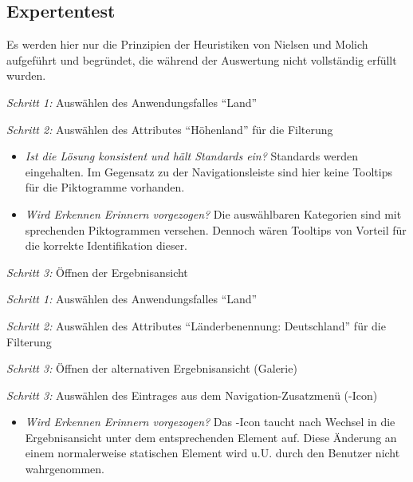 \subsection{Expertentest}
Es werden hier nur die Prinzipien der Heuristiken von Nielsen und Molich aufgeführt und begründet, die während der Auswertung nicht vollständig erfüllt wurden.\par
{}
\textit{Schritt 1:} Auswählen des Anwendungsfalles \enquote{Land}\par
\textit{Schritt 2:} Auswählen des Attributes \enquote{Höhenland} für die Filterung\par
\begin{itemize}
 \item \textit{Ist die Lösung konsistent und hält Standards ein?} Standards werden eingehalten. Im Gegensatz zu der Navigationsleiste sind hier keine Tooltips für die Piktogramme vorhanden.
 \item \textit{Wird Erkennen Erinnern vorgezogen?} Die auswählbaren Kategorien sind mit sprechenden Piktogrammen versehen. Dennoch wären Tooltips von Vorteil für die korrekte Identifikation dieser.
\end{itemize}
\textit{Schritt 3:} Öffnen der Ergebnisansicht\par
{}\par
\textit{Schritt 1:} Auswählen des Anwendungsfalles \enquote{Land}\par
\textit{Schritt 2:} Auswählen des Attributes \enquote{Länderbenennung: Deutschland} für die Filterung\par
\textit{Schritt 3:} Öffnen der alternativen Ergebnisansicht (Galerie)\par
{}\par
\textit{Schritt 3:} Auswählen des Eintrages aus dem Navigation-Zusatzmenü (-Icon)\par
\begin{itemize}
 \item \textit{Wird Erkennen Erinnern vorgezogen?} Das -Icon taucht nach Wechsel in die Ergebnisansicht unter dem entsprechenden Element auf. Diese Änderung an einem normalerweise statischen Element wird u.U. durch den Benutzer nicht wahrgenommen.\par
\end{itemize}
\par

